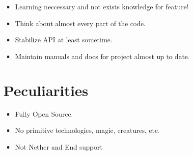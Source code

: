 \documentclass[12pt]{article}
\begin{document}
	\begin{itemize}
		\item Learning neccessary and not exists knowledge for feature!
		\item Think about almost every part of the code.
		\item Stabilize API at least sometime.
		\item Maintain manuals and docs for project almost up to date.
	\end{itemize}

	\section{Peculiarities}

	\begin{itemize}
		\item Fully Open Source.
		\item No primitive technologies, magic, creatures, etc.
		\item Not Nether and End support
	\end{itemize}
\end{document}
